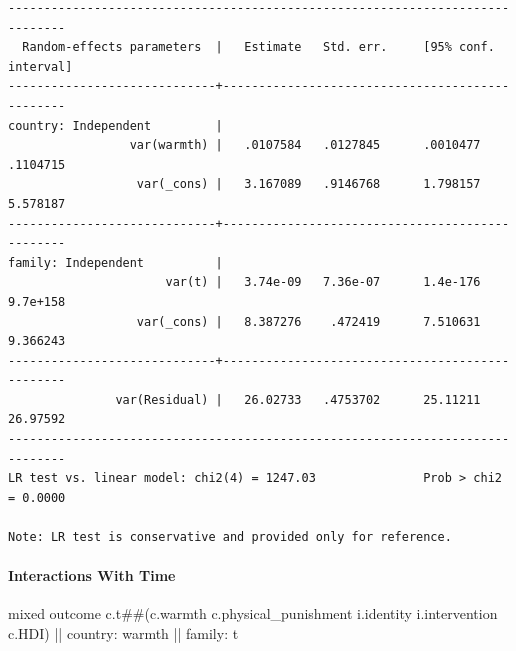 \documentclass[
  letterpaper,
  DIV=11,
  numbers=noendperiod]{scrreprt}
\let\oldparagraph\paragraph
\renewcommand{\paragraph}[1]{\oldparagraph{#1}\mbox{}}
\newenvironment{Shaded}{\begin{snugshade}}{\end{snugshade}}
\newcommand{\KeywordTok}[1]{\textcolor[rgb]{0.00,0.23,0.31}{#1}}
\newcommand{\NormalTok}[1]{\textcolor[rgb]{0.00,0.23,0.31}{#1}}
\begin{document}
\begin{verbatim}
------------------------------------------------------------------------------
  Random-effects parameters  |   Estimate   Std. err.     [95% conf. interval]
-----------------------------+------------------------------------------------
country: Independent         |
                 var(warmth) |   .0107584   .0127845      .0010477    .1104715
                  var(_cons) |   3.167089   .9146768      1.798157    5.578187
-----------------------------+------------------------------------------------
family: Independent          |
                      var(t) |   3.74e-09   7.36e-07      1.4e-176    9.7e+158
                  var(_cons) |   8.387276    .472419      7.510631    9.366243
-----------------------------+------------------------------------------------
               var(Residual) |   26.02733   .4753702      25.11211    26.97592
------------------------------------------------------------------------------
LR test vs. linear model: chi2(4) = 1247.03               Prob > chi2 = 0.0000

Note: LR test is conservative and provided only for reference.
\end{verbatim}

\paragraph{Interactions With Time}\label{interactions-with-time}

\begin{Shaded}
\begin{Highlighting}[]
\NormalTok{mixed outcome c.t\#\#(c.warmth c.physical\_punishment i.}\KeywordTok{identity}\NormalTok{ i.intervention c.HDI) || country: warmth || }\KeywordTok{family}\NormalTok{: t}
\end{Highlighting}
\end{Shaded}
\end{document}
